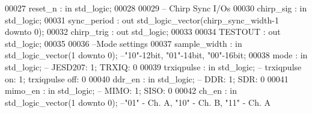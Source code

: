 \begin{DoxyCode}
00027       \textcolor{vhdlchar}{reset_n}               \textcolor{vhdlchar}{:} \textcolor{keywordflow}{in} \textcolor{comment}{std\_logic};
00028         
00029 \textcolor{keyword}{        -- Chirp Sync I/Os}
00030         \textcolor{vhdlchar}{chirp_sig}               \textcolor{vhdlchar}{:} \textcolor{keywordflow}{in} \textcolor{comment}{std\_logic};
00031         \textcolor{vhdlchar}{sync_period}             \textcolor{vhdlchar}{:} \textcolor{keywordflow}{out} \textcolor{comment}{std\_logic\_vector}\textcolor{vhdlchar}{(}\textcolor{vhdlchar}{chirp_sync_width}\textcolor{vhdlchar}{-}\textcolor{vhdllogic}{}\textcolor{vhdllogic}{1} \textcolor{keywordflow}{downto} \textcolor{vhdllogic}{}\textcolor{vhdllogic}{0}\textcolor{vhdlchar}{)};
00032         \textcolor{vhdlchar}{chirp_trig}              \textcolor{vhdlchar}{:} \textcolor{keywordflow}{out} \textcolor{comment}{std\_logic};
00033         
00034         \textcolor{vhdlchar}{TESTOUT}                 \textcolor{vhdlchar}{:} \textcolor{keywordflow}{out} \textcolor{comment}{std\_logic};
00035       
00036 \textcolor{keyword}{        --Mode settings}
00037       \textcolor{vhdlchar}{sample_width}         \textcolor{vhdlchar}{:} \textcolor{keywordflow}{in} \textcolor{comment}{std\_logic\_vector}\textcolor{vhdlchar}{(}\textcolor{vhdllogic}{}\textcolor{vhdllogic}{1} \textcolor{keywordflow}{downto} \textcolor{vhdllogic}{}\textcolor{vhdllogic}{0}\textcolor{vhdlchar}{)};\textcolor{keyword}{ --"10"-12bit, "01"-14bit, "00"-16bit;}
00038       \textcolor{vhdlchar}{mode}                 \textcolor{vhdlchar}{:} \textcolor{keywordflow}{in} \textcolor{comment}{std\_logic};\textcolor{keyword}{ -- JESD207: 1; TRXIQ: 0}
00039       \textcolor{vhdlchar}{trxiqpulse}           \textcolor{vhdlchar}{:} \textcolor{keywordflow}{in} \textcolor{comment}{std\_logic};\textcolor{keyword}{ -- trxiqpulse on: 1; trxiqpulse off: 0}
00040       \textcolor{vhdlchar}{ddr_en}               \textcolor{vhdlchar}{:} \textcolor{keywordflow}{in} \textcolor{comment}{std\_logic};\textcolor{keyword}{ -- DDR: 1; SDR: 0}
00041       \textcolor{vhdlchar}{mimo_en}              \textcolor{vhdlchar}{:} \textcolor{keywordflow}{in} \textcolor{comment}{std\_logic};\textcolor{keyword}{ -- MIMO: 1; SISO: 0}
00042       \textcolor{vhdlchar}{ch_en}                \textcolor{vhdlchar}{:} \textcolor{keywordflow}{in} \textcolor{comment}{std\_logic\_vector}\textcolor{vhdlchar}{(}\textcolor{vhdllogic}{}\textcolor{vhdllogic}{1} \textcolor{keywordflow}{downto} \textcolor{vhdllogic}{}\textcolor{vhdllogic}{0}\textcolor{vhdlchar}{)};\textcolor{keyword}{ --"01" - Ch. A, "10" - Ch. B, "11" - Ch. A
}
\end{DoxyCode}
